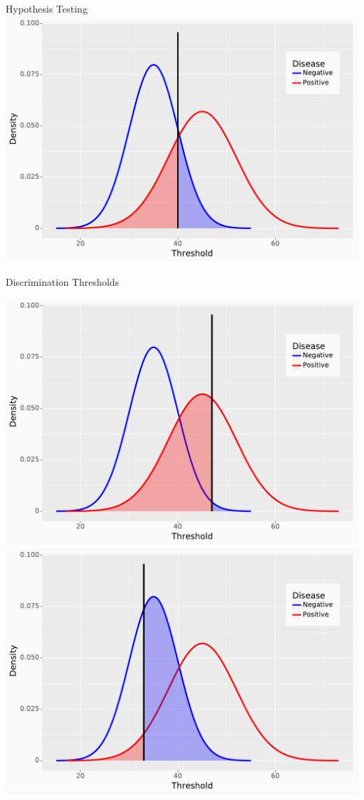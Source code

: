 \documentclass[10pt, xcolor=table]{beamer}
\begin{document}
\begin{frame}{Hypothesis Testing}
	\includegraphics[height=0.8\textheight]{images/overlap_distr.pdf}
\end{frame}


\begin{frame}{Discrimination Thresholds}
	\begin{center}
		\includegraphics[height=0.45\textheight]{images/overlap_distr_thi.pdf}\\
		\includegraphics[height=0.45\textheight]{images/overlap_distr_tlow.pdf}
	\end{center}
\end{frame}
\end{document}
